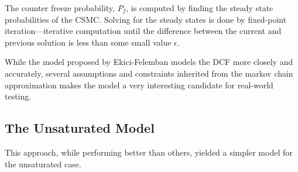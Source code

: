 The counter freeze probability, $P_f$, is computed by finding the steady state
probabilities of the CSMC. Solving for the steady states is done by
fixed-point iteration—iterative computation until the difference between the
current and previous solution is less than some small value $\epsilon$.

While the model proposed by Ekici-Felemban models the DCF more closely and
accurately, several assumptions and constraints inherited from the markov
chain approximation makes the model a very interesting candidate for
real-world testing.

\subsection{The Unsaturated Model}

This approach, while performing better than others, yielded a simpler model
for the unsaturated case.